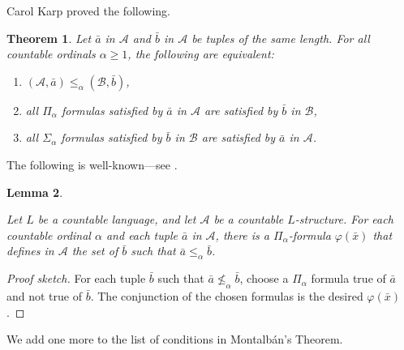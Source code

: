 \documentclass{article}
\newtheorem{thm}{Theorem}[section]
\newtheorem{lem}[thm]{Lemma}
\begin{document}
Carol Karp \cite{Karp} proved the following.

\begin{thm}

Let $\bar{a}$ in $\mathcal{A}$ and $\bar{b}$ in $\mathcal{A}$ be tuples of the same length.  For all countable ordinals $\alpha\geq 1$, the following are equivalent:

\begin{enumerate}

\item  $(\mathcal{A},\bar{a})\leq_\alpha(\mathcal{B},\bar{b})$,

\item  all $\Pi_\alpha$ formulas satisfied by $\bar{a}$ in $\mathcal{A}$ are satisfied by $\bar{b}$ in $\mathcal{B}$,

\item  all $\Sigma_\alpha$ formulas satisfied by $\bar{b}$ in $\mathcal{B}$ are satisfied by $\bar{a}$ in $\mathcal{A}$.

\end{enumerate}

\end{thm}  

The following is well-known---see \cite{AK}.  

\begin{lem}
\label{Pialpha}

Let $L$ be a countable language, and let $\mathcal{A}$ be a countable $L$-structure.  For each countable ordinal $\alpha$ and each tuple $\bar{a}$ in $\mathcal{A}$, there is a $\Pi_\alpha$-formula $\varphi(\bar{x})$ that defines in $\mathcal{A}$ the set of $\bar{b}$ such that $\bar{a}\leq_\alpha\bar{b}$.

\end{lem}

\begin{proof} [Proof sketch]

For each tuple $\bar{b}$ such that $\bar{a}\not\leq_\alpha\bar{b}$, choose a $\Pi_\alpha$ formula true of $\bar{a}$ and not true of $\bar{b}$.  The conjunction of the chosen formulas is the desired $\varphi(\bar{x})$.
\end{proof}

We add one more to the list of conditions in Montalb\'{a}n's Theorem.   
\end{document}
